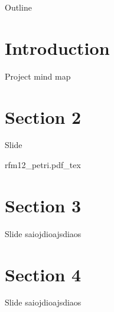 \begin{frame}
\titlepage
\end{frame}

\begin{frame}{Outline}
\tableofcontents
\end{frame}

\section{Introduction} %
\begin{frame}{Project mind map}
\begin{center}
\scalebox{0.56} {
}
\end{center}
\end{frame}

\section{Section 2} %
\begin{frame}{Slide}
\begin{center}
\scalebox{0.8} {
{rfm12_petri.pdf_tex}
}
\end{center}
\end{frame}

\section{Section 3} %
\begin{frame}{Slide}
saiojdioajsdiaos
\end{frame}

\section{Section 4} %
\begin{frame}{Slide}
saiojdioajsdiaos
\end{frame}
